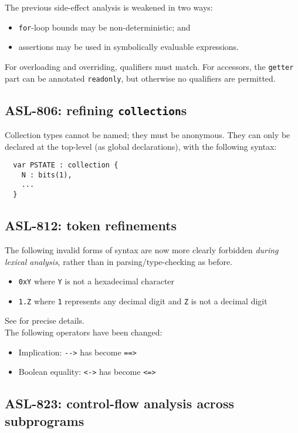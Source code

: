 \noindent
The previous side-effect analysis is weakened in two ways:
\begin{itemize}
  \item \texttt{for}-loop bounds may be non-deterministic; and
  \item assertions may be used in symbolically evaluable expressions.
\end{itemize}

\noindent
For overloading and overriding, qualifiers must match.
For accessors, the \texttt{getter} part can be annotated \texttt{readonly}, but otherwise no qualifiers are permitted.

\subsection{ASL-806: refining \texttt{collection}s}

Collection types cannot be named; they must be anonymous.
They can only be declared at the top-level (as global declarations), with the following syntax:
\begin{lstlisting}
  var PSTATE : collection {
    N : bits(1),
    ...
  }
\end{lstlisting}

\subsection{ASL-812: token refinements}

The following invalid forms of syntax are now more clearly forbidden \emph{during lexical analysis}, rather than in parsing/type-checking as before.
\begin{itemize}
  \item \texttt{0xY} where \texttt{Y} is not a hexadecimal character
  \item \texttt{1.Z} where \texttt{1} represents any decimal digit and \texttt{Z} is not a decimal digit
\end{itemize}
See  for precise details.\\

\noindent
The following operators have been changed:
\begin{itemize}
  \item Implication: \texttt{{-}{-}{>}} has become \texttt{{=}{=}{>}}
  \item Boolean equality: \texttt{{<}{-}{>}} has become \texttt{{<}{=}{>}}
\end{itemize}

\subsection{ASL-823: control-flow analysis across subprograms}

